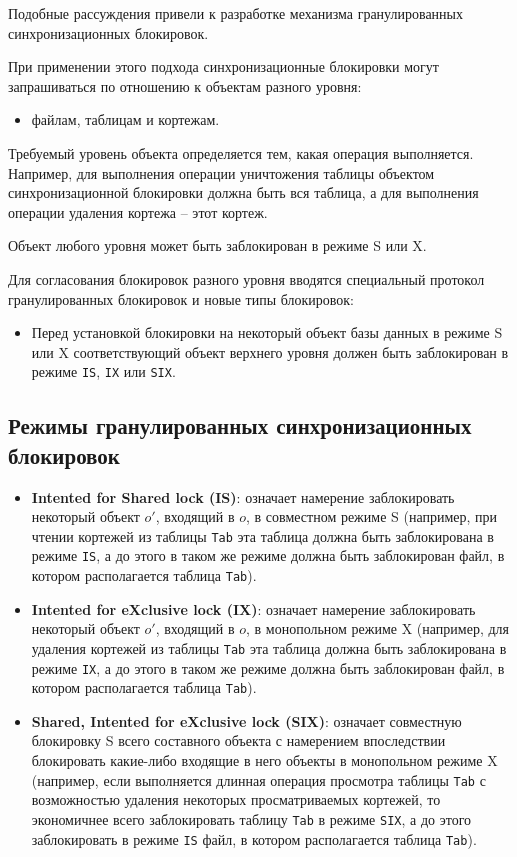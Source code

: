 \documentclass[a4paper,12pt]{article}
\begin{document}
Подобные рассуждения привели к разработке механизма гранулированных синхронизационных блокировок.

При применении этого подхода синхронизационные блокировки могут запрашиваться по отношению к объектам разного уровня:
\begin{itemize}
    \item файлам, таблицам и кортежам.
\end{itemize}

Требуемый уровень объекта определяется тем, какая операция выполняется. Например, для выполнения операции уничтожения таблицы объектом синхронизационной блокировки должна быть вся таблица, а для выполнения операции удаления кортежа – этот кортеж.

Объект любого уровня может быть заблокирован в режиме S или X.

Для согласования блокировок разного уровня вводятся специальный протокол гранулированных блокировок и новые типы блокировок:
\begin{itemize}
    \item Перед установкой блокировки на некоторый объект базы данных в режиме S или X соответствующий объект верхнего уровня должен быть заблокирован в режиме \texttt{IS}, \texttt{IX} или \texttt{SIX}.
\end{itemize}

\subsection{Режимы гранулированных синхронизационных блокировок}

\begin{itemize}
    \item \textbf{Intented for Shared lock (IS)}: означает намерение заблокировать некоторый объект $o'$, входящий в $o$, в совместном режиме S (например, при чтении кортежей из таблицы \texttt{Tab} эта таблица должна быть заблокирована в режиме \texttt{IS}, а до этого в таком же режиме должна быть заблокирован файл, в котором располагается таблица \texttt{Tab}).
    \item \textbf{Intented for eXclusive lock (IX)}: означает намерение заблокировать некоторый объект $o'$, входящий в $o$, в монопольном режиме X (например, для удаления кортежей из таблицы \texttt{Tab} эта таблица должна быть заблокирована в режиме \texttt{IX}, а до этого в таком же режиме должна быть заблокирован файл, в котором располагается таблица \texttt{Tab}).
    \item \textbf{Shared, Intented for eXclusive lock (SIX)}: означает совместную блокировку S всего составного объекта с намерением впоследствии блокировать какие-либо входящие в него объекты в монопольном режиме X (например, если выполняется длинная операция просмотра таблицы \texttt{Tab} с возможностью удаления некоторых просматриваемых кортежей, то экономичнее всего заблокировать таблицу \texttt{Tab} в режиме \texttt{SIX}, а до этого заблокировать в режиме \texttt{IS} файл, в котором располагается таблица \texttt{Tab}).
\end{itemize}
\end{document}
